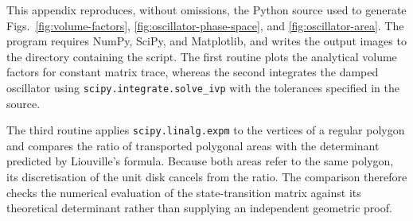 \documentclass[11pt,a4paper]{article}
\theoremstyle{definition}
\numberwithin{equation}{section}
\begin{document}
This appendix reproduces, without omissions, the Python source used to generate Figs.~\ref{fig:volume-factors}, \ref{fig:oscillator-phase-space}, and \ref{fig:oscillator-area}. The program requires NumPy, SciPy, and Matplotlib, and writes the output images to the directory containing the script. The first routine plots the analytical volume factors for constant matrix trace, whereas the second integrates the damped oscillator using \texttt{scipy.integrate.solve\_ivp} with the tolerances specified in the source.

The third routine applies \texttt{scipy.linalg.expm} to the vertices of a regular polygon and compares the ratio of transported polygonal areas with the determinant predicted by Liouville's formula. Because both areas refer to the same polygon, its discretisation of the unit disk cancels from the ratio. The comparison therefore checks the numerical evaluation of the state-transition matrix against its theoretical determinant rather than supplying an independent geometric proof.
\end{document}
